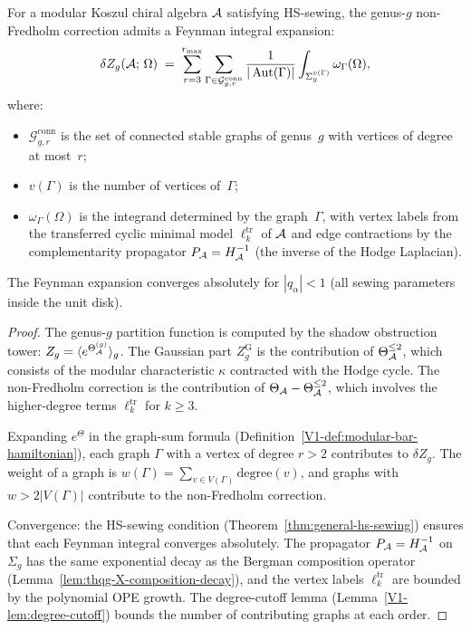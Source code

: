 \begin{theorem}%
%
For a modular Koszul chiral algebra $\mathcal{A}$ satisfying HS-sewing,
the genus-$g$ non-Fredholm correction admits a Feynman integral
expansion:
\begin{equation}%
\delta Z_g(\cA;\,\Omega)
\;=\;
\sum_{r=3}^{r_{\max}}
\sum_{\Gamma \in \mathcal{G}^{\mathrm{conn}}_{g,r}}
\frac{1}{|\Aut(\Gamma)|}
\int_{\Sigma_g^{v(\Gamma)}}
\omega_\Gamma(\Omega),
\end{equation}
where:
\begin{itemize}
\item $\mathcal{G}^{\mathrm{conn}}_{g,r}$ is the set of
 connected stable graphs of genus~$g$ with vertices of
 degree at most~$r$;
\item $v(\Gamma)$ is the number of vertices of~$\Gamma$;
\item $\omega_\Gamma(\Omega)$ is the integrand determined by
 the graph~$\Gamma$, with vertex labels from the transferred
 cyclic minimal model $\ell_k^{\mathrm{tr}}$ of $\mathcal{A}$ and
 edge contractions by the complementarity propagator
 $P_{\mathcal{A}} = H_{\mathcal{A}}^{-1}$ (the inverse of the Hodge Laplacian).
\end{itemize}
The Feynman expansion converges absolutely for $|q_\alpha| < 1$
(all sewing parameters inside the unit disk).
\end{theorem}

\begin{proof}
The genus-$g$ partition function is computed by the shadow
obstruction tower: $Z_g = \langle e^{\Theta_{\mathcal{A}}^{(g)}} \rangle_g$.
The Gaussian part $Z_g^{\mathrm{G}}$ is the contribution of
$\Theta_{\mathcal{A}}^{\leq 2}$, which consists of the modular
characteristic $\kappa$ contracted with the Hodge cycle.
The non-Fredholm correction is the contribution of
$\Theta_{\mathcal{A}} - \Theta_{\mathcal{A}}^{\leq 2}$, which involves the
higher-degree terms $\ell_k^{\mathrm{tr}}$ for $k \geq 3$.

Expanding $e^{\Theta}$ in the graph-sum formula
(Definition~\ref*{V1-def:modular-bar-hamiltonian}), each
graph $\Gamma$ with a vertex of degree $r > 2$ contributes to
$\delta Z_g$. The weight of a graph is
$w(\Gamma) = \sum_{v \in V(\Gamma)} \mathrm{degree}(v)$,
and graphs with $w > 2|V(\Gamma)|$ contribute to the
non-Fredholm correction.

Convergence: the HS-sewing condition
(Theorem~\ref{thm:general-hs-sewing}) ensures that each
Feynman integral converges absolutely. The propagator
$P_{\mathcal{A}} = H_{\mathcal{A}}^{-1}$ on $\Sigma_g$ has the same exponential
decay as the Bergman composition operator
(Lemma~\ref{lem:thqg-X-composition-decay}), and the vertex
labels $\ell_k^{\mathrm{tr}}$ are bounded by the polynomial
OPE growth. The degree-cutoff lemma (Lemma~\ref{V1-lem:degree-cutoff})
bounds the number of contributing graphs at each order.
\end{proof}

